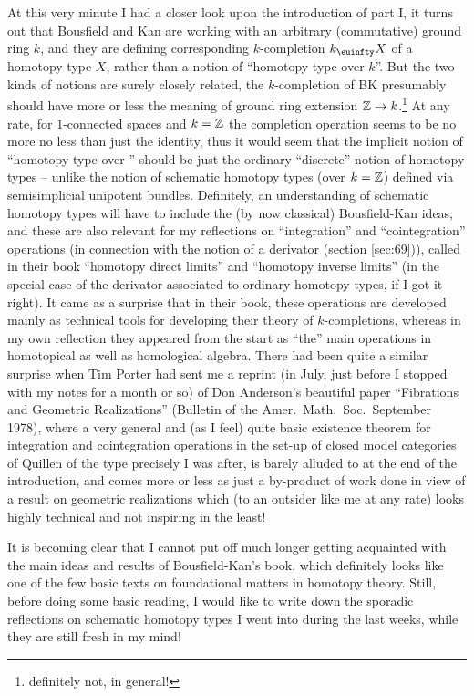 At this very minute I had a closer look upon the introduction of part
I, it turns out that Bousfield and Kan are working with an arbitrary
(commutative) ground ring $k$, and they are defining corresponding
$k$-completion $k_\oo X$ of a homotopy type $X$, rather than a notion
of ``homotopy type over $k$''. But the two kinds of notions are surely
closely related, the $k$-completion of BK presumably should have more
or less the meaning of ground ring extension ${\mathbb{Z}}\to
k$.\footnote{definitely not, in general!} At any rate, for
$1$-connected spaces and $k={\mathbb{Z}}$ the completion operation seems to be
no more no less than just the identity, thus it would seem that the
implicit notion of ``homotopy type over \bZ'' should be just the
ordinary ``discrete'' notion of homotopy types -- unlike the notion
of schematic homotopy types (over $k={\mathbb{Z}}$) defined via
semisimplicial unipotent bundles. Definitely, an understanding of
schematic homotopy types will have to include the (by now classical)
Bousfield-Kan ideas, and these are also relevant for my reflections on
``integration'' and ``cointegration'' operations (in connection with
the notion of a derivator (section \ref{sec:69})), called in their
book ``homotopy direct limits'' and ``homotopy inverse limits'' (in
the special case of the derivator associated to ordinary homotopy
types, if I got it right). It came as a surprise that in their book,
these operations are developed mainly as technical tools for
developing their theory of $k$-completions, whereas in my own
reflection they appeared from the start as ``the'' main operations in
homotopical as well as homological algebra. There had been quite a
similar surprise when Tim Porter had sent me a reprint (in July, just
before I stopped with my notes for a month or so) of Don Anderson's
beautiful paper ``Fibrations and Geometric
Realizations'' (Bulletin of
the Amer.\ Math.\ Soc.\ September 1978), where a very general and (as
I feel) quite basic existence theorem for integration and
cointegration operations in the set-up of closed model categories of
Quillen of the type precisely I was after, is barely alluded to at the
end of the introduction, and comes more or less as just a by-product
of work done in view of a result on geometric realizations which (to
an outsider like me at any rate) looks highly technical and not
inspiring in the least!

It is becoming clear that I cannot put off much longer getting
acquainted with the main ideas and results of Bousfield-Kan's book,
which definitely looks like one of the few basic texts on foundational
matters in homotopy theory. Still, before doing some basic reading, I
would like to write down the sporadic reflections on schematic
homotopy types I went into during the last weeks, while they are still
fresh in my mind!

